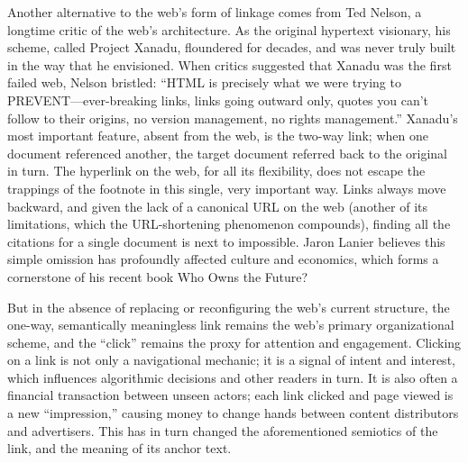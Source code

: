 Another alternative to the web’s form of linkage comes from Ted Nelson, a longtime critic of the web’s architecture. As the original hypertext visionary, his scheme, called Project Xanadu, floundered for decades, and was never truly built in the way that he envisioned. When critics suggested that Xanadu was the first failed web, Nelson bristled: “HTML is precisely what we were trying to PREVENT—ever-breaking links, links going outward only, quotes you can’t follow to their origins, no version management, no rights management.”  Xanadu’s most important feature, absent from the web, is the two-way link; when one document referenced another, the target document referred back to the original in turn. The hyperlink on the web, for all its flexibility, does not escape the trappings of the footnote in this single, very important way. Links always move backward, and given the lack of a canonical URL on the web (another of its limitations, which the URL-shortening phenomenon compounds), finding all the citations for a single document is next to impossible. Jaron Lanier believes this simple omission has profoundly affected culture and economics, which forms a cornerstone of his recent book Who Owns the Future? 

But in the absence of replacing or reconfiguring the web’s current structure, the one-way, semantically meaningless link remains the web’s primary organizational scheme, and the “click” remains the proxy for attention and engagement. Clicking on a link is not only a navigational mechanic; it is a signal of intent and interest, which influences algorithmic decisions and other readers in turn. It is also often a financial transaction between unseen actors; each link clicked and page viewed is a new “impression,” causing money to change hands between content distributors and advertisers. This has in turn changed the aforementioned semiotics of the link, and the meaning of its anchor text.

